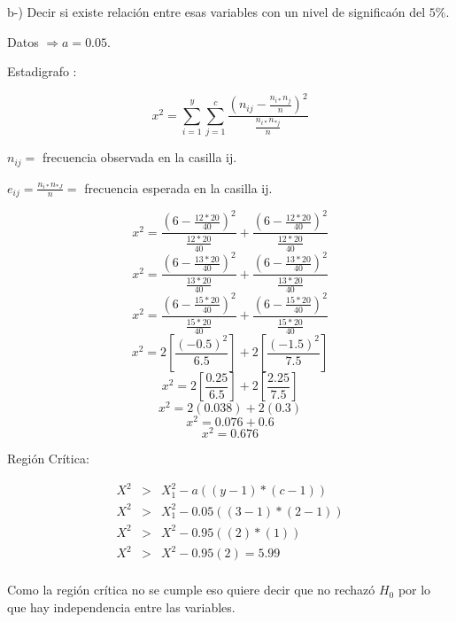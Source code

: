 \documentclass{article}
\begin{document}
		\begin{flushleft}
			b-) Decir si existe relaci\'on entre esas variables con un nivel de significa\'on del $5\%$.
		\end{flushleft}
		\begin{flushleft}
			Datos $\Rightarrow a = 0.05$.
		\end{flushleft}
		\begin{flushleft}
			Estadigrafo :
		\end{flushleft}
		$$ x^2 = \sum_{i=1}^{y}\sum_{j=1}^{c}\frac{\left(n_{ij} - \frac{n_{i*}n_{j}}{n}\right)^2}{\frac{n_{i*}n_{*j}}{n}}$$
		\begin{flushleft}
			$n_{ij} =$ frecuencia observada en la casilla ij.
		\end{flushleft}
		\begin{flushleft}
			$e_{ij} = \frac{n_{i*}n_{*J}}{n} =$ frecuencia esperada en la casilla ij.
		\end{flushleft}
		$$x^2 = \frac{\left(6 - \frac{12 * 20}{40}\right)^2}{\frac{12 * 20}{40}} + \frac{\left(6 - \frac{12 * 20}{40}\right)^2}{\frac{12 * 20}{40}}$$
		$$x^2 = \frac{\left(6 - \frac{13 * 20}{40}\right)^2}{\frac{13 * 20}{40}} + \frac{\left(6 - \frac{13 * 20}{40}\right)^2}{\frac{13 * 20}{40}}$$
		$$x^2 = \frac{\left(6 - \frac{15 * 20}{40}\right)^2}{\frac{15 * 20}{40}} + \frac{\left(6 - \frac{15 * 20}{40}\right)^2}{\frac{15 * 20}{40}}$$
		$$x^2 = 2\left[\frac{\left(-0.5\right)^2}{6.5}\right] + 2\left[\frac{\left(-1.5\right)^2}{7.5}\right]$$
		$$x^2 = 2\left[\frac{0.25}{6.5}\right] + 2\left[\frac{2.25}{7.5}\right]$$
		$$x^2 = 2\left(0.038\right) + 2\left(0.3\right)$$
		$$x^2 = 0.076 + 0.6$$
		$$x^2 = 0.676$$

		\begin{flushleft}
			Regi\'on Cr\'itica:
		\end{flushleft}
		\begin{equation*}    
		\begin{array}{lcl}
			X^2 & > & X_{1}^{2} - a \left(\left(y-1\right)*\left(c-1\right)\right)\\
			X^2 & > & X_{1}^{2} - 0.05 \left(\left(3-1\right)*\left(2-1\right)\right)\\
			X^2 & > & X^{2} - 0.95 \left(\left(2\right)*\left(1\right)\right)\\
			X^2 & > & X^{2} - 0.95 \left(2\right) = 5.99\\
		\end{array}
		\end{equation*}

		\begin{flushleft}
			Como la regi\'on cr\'itica no se cumple eso quiere decir que no rechaz\'o $H_{0}$ por lo que hay independencia entre las variables.
		\end{flushleft}
		
\end{document}
